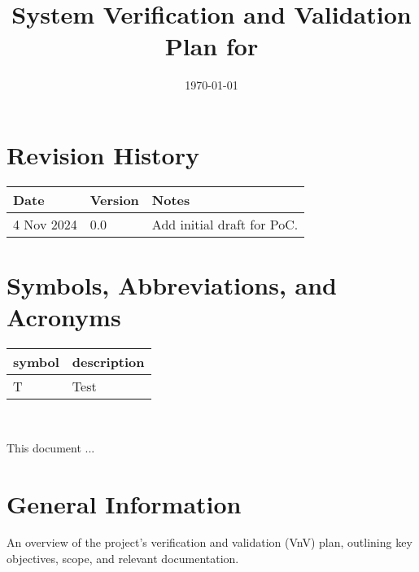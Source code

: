 \documentclass[12pt, titlepage]{article}
\begin{document}
\title{System Verification and Validation Plan for \progname{}} 
\author{\authname}
\date{\today}
	
\maketitle


\section*{Revision History}

\begin{tabularx}{\textwidth}{p{3cm}p{2cm}X} \toprule {\bf Date} & {\bf Version}
& {\bf Notes}\\
\midrule
4 Nov 2024 & 0.0 & Add initial draft for PoC.\\
\bottomrule
\end{tabularx}

\newpage

\tableofcontents

\listoftables

\newpage

\section{Symbols, Abbreviations, and Acronyms}

\renewcommand{\arraystretch}{1.2}
\begin{tabular}{l l} 
  \toprule		
  \textbf{symbol} & \textbf{description}\\
  \midrule 
  T & Test\\
  \bottomrule
\end{tabular}\\



\newpage


This document ... 

\section{General Information}
An overview of the project's verification and validation (VnV) plan, outlining
key objectives, scope, and relevant documentation.
\end{document}
